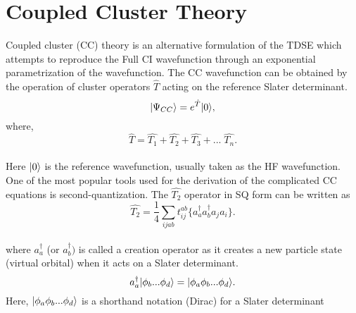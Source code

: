 \section{Coupled Cluster Theory} 
Coupled cluster (CC) theory\cite{Crawford00} is an alternative formulation of the TDSE which attempts to 
reproduce the Full CI wavefunction through an exponential parametrization
of the wavefunction. The CC wavefunction can be obtained by the operation of cluster
operators $\hat{T}$ acting on the reference Slater determinant. 
\\
\begin{equation}
| \Psi_{CC} \rangle = e^{\hat{T}}| 0 \rangle , 
\end{equation}
where,
\begin{equation}
 \hat{T} = \hat{T_1} + \hat{T_2} + \hat{T_3} + ... \;\hat {T_n}.
\end{equation}
\\
Here $| 0 \rangle$ is the reference wavefunction, usually taken as the HF
wavefunction. One of the most popular tools used for the derivation of the 
complicated CC equations is second-quantization\cite{JorgensenSimons81}.
The $\hat{T_2}$ operator in SQ form can be written as
\\
\begin{equation}
\hat{T_2} = \frac{1}{4}\sum_{ijab}t^{ab}_{ij}\{a^\dagger_aa^\dagger_ba_ja_i\}.
\end{equation}
\\
where ${a}^\dagger_a$ (or ${a}^\dagger_b)$ is called a creation operator as it 
creates a new particle state (virtual orbital) when it acts on a Slater determinant.
\begin{equation}
{a}^\dagger_a| \phi_b...\phi_d \rangle = | \phi_a\phi_b...\phi_d \rangle.
\end{equation}
Here, $| \phi_a\phi_b...\phi_d \rangle$ is a shorthand notation (Dirac) for a Slater determinant
